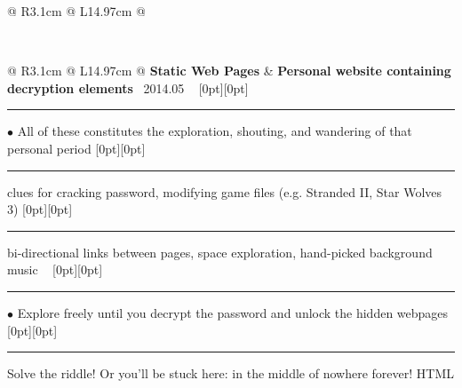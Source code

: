 {{\begin{tabularx}{\linewidth}{@{} R{3.1cm} @{\phantom{d}} L{14.97cm} @{}}
\end{tabularx}
\\
\begin{tabularx}{\linewidth}{@{} R{3.1cm} @{\phantom{d}} L{14.97cm} @{}}
	\textbf{Static Web Pages} & \hspace{10pt} \textbf{Personal website containing decryption elements} \hfill \textendash\ 2014.05 \newline \vspace{2pt} \ \hspace{-3pt} \raisebox{0.09\height}[0pt][0pt]{\vrule width0.5pt height30.0pt} \hspace{-0.26em}\rule[0.25em]{1.0em}{0.5pt}\!\! $\bullet$ {\small All of these constitutes the exploration, shouting, and wandering of that personal period} \newline \vspace{-3pt} \hspace{12.5pt} \raisebox{0.18\height}[0pt][0pt]{\vrule width0.5pt height15.0pt} \hspace{-0.26em}\rule[0.25em]{1.0em}{0.5pt}\!\! \raisebox{0.2\height}{\scriptsize $\blacktriangleright$} {\small clues for cracking password, modifying game files (e.g. Stranded II, Star Wolves 3)} \newline \vspace{-3pt} \hspace{12.5pt} \raisebox{0.18\height}[0pt][0pt]{\vrule width0.5pt height15.0pt} \hspace{-0.26em}\rule[0.25em]{1.0em}{0.5pt}\!\! \raisebox{0.2\height}{\scriptsize $\blacktriangleright$} {\small bi-directional links between pages, space exploration, hand-picked background music} \newline \vspace{-3pt} \ \hspace{-3pt} \raisebox{0.06\height}[0pt][0pt]{\vrule width0.5pt height45.0pt} \hspace{-0.26em}\rule[0.25em]{1.0em}{0.5pt}\!\! $\bullet$ {\small Explore freely until you decrypt the password and unlock the hidden webpages} \newline \vspace{-3pt} \hspace{12.5pt} \raisebox{0.18\height}[0pt][0pt]{\vrule width0.5pt height15.0pt} \hspace{-0.26em}\rule[0.25em]{1.0em}{0.5pt}\!\! \raisebox{0.2\height}{\scriptsize $\blacktriangleright$} {\small Solve the riddle! Or you'll be stuck here: in the middle of nowhere forever!} \hfill {\small \color{color-detail} HTML} \href{https://github.com/ChenZhu-Xie/offline_web_pages}{\color{black!50}\faGithub} \\ \Gap\Gap\Gap

\end{tabularx}}}
